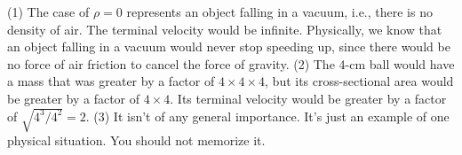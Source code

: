 (1) The case of 
$\rho=0$ represents an object falling in a vacuum, i.e.,
 there is no density of air. The terminal velocity
would be infinite. Physically, we know that an object falling
 in a vacuum would never stop speeding up, since there
would be no force of air friction to cancel the force of gravity. 
(2) The 4-cm ball would have a mass that was greater
by a factor of $4\times4\times4$, but its cross-sectional area would
 be greater by a factor of $4\times4$. Its terminal velocity would be
greater by a factor of $\sqrt{4^3/4^2}=2$.
(3) It isn't of any general importance. It's just an example of one
physical situation. You should not memorize it.




